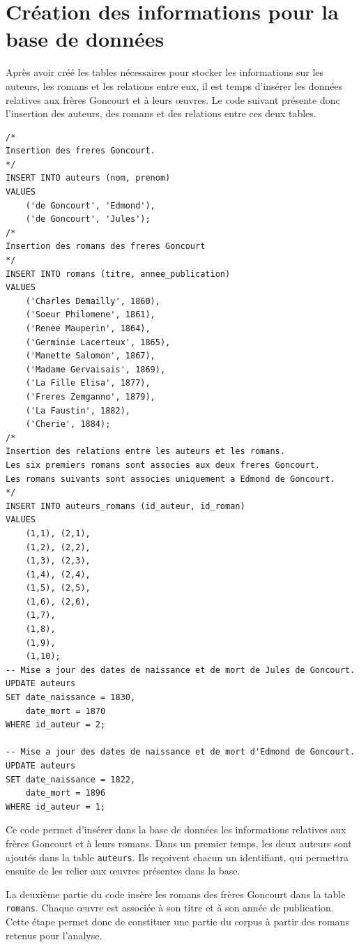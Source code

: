 \section{Création des informations pour la base de données}

Après avoir créé les tables nécessaires pour stocker les informations sur les auteurs, les romans et les relations entre eux, il est temps d'insérer les données relatives aux frères Goncourt et à leurs œuvres. Le code suivant présente donc l'insertion des auteurs, des romans et des relations entre ces deux tables.

\begin{verbatim}
/*
Insertion des freres Goncourt.
*/
INSERT INTO auteurs (nom, prenom) 
VALUES
    ('de Goncourt', 'Edmond'),
    ('de Goncourt', 'Jules');
/*
Insertion des romans des freres Goncourt
*/
INSERT INTO romans (titre, annee_publication) 
VALUES
    ('Charles Demailly', 1860),
    ('Soeur Philomene', 1861),
    ('Renee Mauperin', 1864),
    ('Germinie Lacerteux', 1865),
    ('Manette Salomon', 1867),
    ('Madame Gervaisais', 1869),
    ('La Fille Elisa', 1877),
    ('Freres Zemganno', 1879),
    ('La Faustin', 1882),
    ('Cherie', 1884);
/*
Insertion des relations entre les auteurs et les romans.
Les six premiers romans sont associes aux deux freres Goncourt.
Les romans suivants sont associes uniquement a Edmond de Goncourt.
*/
INSERT INTO auteurs_romans (id_auteur, id_roman) 
VALUES
    (1,1), (2,1),
    (1,2), (2,2),
    (1,3), (2,3),
    (1,4), (2,4),
    (1,5), (2,5),
    (1,6), (2,6),
    (1,7),
    (1,8),
    (1,9),
    (1,10);
-- Mise a jour des dates de naissance et de mort de Jules de Goncourt.
UPDATE auteurs
SET date_naissance = 1830,
    date_mort = 1870
WHERE id_auteur = 2;

-- Mise a jour des dates de naissance et de mort d'Edmond de Goncourt.
UPDATE auteurs
SET date_naissance = 1822,
    date_mort = 1896
WHERE id_auteur = 1;

\end{verbatim}

Ce code permet d'insérer dans la base de données les informations relatives aux frères Goncourt et à leurs romans. Dans un premier temps, les deux auteurs sont ajoutés dans la table \texttt{auteurs}. Ils reçoivent chacun un identifiant, qui permettra ensuite de les relier aux œuvres présentes dans la base.

La deuxième partie du code insère les romans des frères Goncourt dans la table \texttt{romans}. Chaque œuvre est associée à son titre et à son année de publication. Cette étape permet donc de constituer une partie du corpus à partir des romans retenus pour l'analyse.

